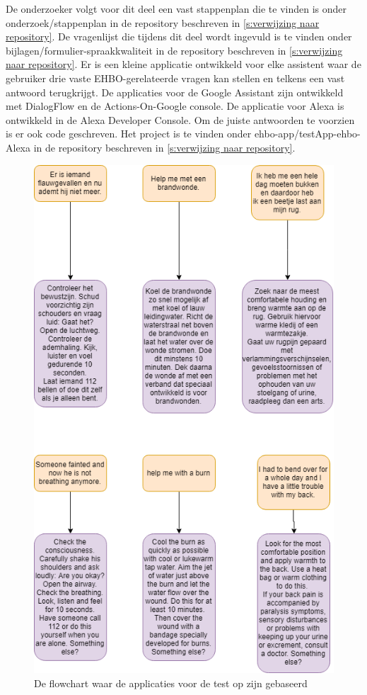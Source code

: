 De onderzoeker volgt voor dit deel een vast stappenplan die te vinden is onder onderzoek/stappenplan in de repository beschreven in \ref{s:verwijzing naar repository}.
De vragenlijst die tijdens dit deel wordt ingevuld is te vinden onder bijlagen/formulier-spraakkwaliteit in de repository beschreven in \ref{s:verwijzing naar repository}.
Er is een kleine applicatie ontwikkeld voor elke assistent waar de gebruiker drie vaste EHBO-gerelateerde vragen kan stellen en telkens een vast antwoord terugkrijgt. De applicaties voor de Google Assistant zijn ontwikkeld met DialogFlow en de Actions-On-Google console. De applicatie voor Alexa is ontwikkeld in de Alexa Developer Console. Om de juiste antwoorden te voorzien is er ook code geschreven. Het project is te vinden onder ehbo-app/testApp-ehbo-Alexa in de repository beschreven in \ref{s:verwijzing naar repository}.

\begin{figure}[H]
    \centering
    \includegraphics[width=0.7\linewidth]{img/flowdiagram_testapp}
    \caption{De flowchart waar de applicaties voor de test op zijn gebaseerd}
    \label{fig:flowdiagram}
\end{figure}

